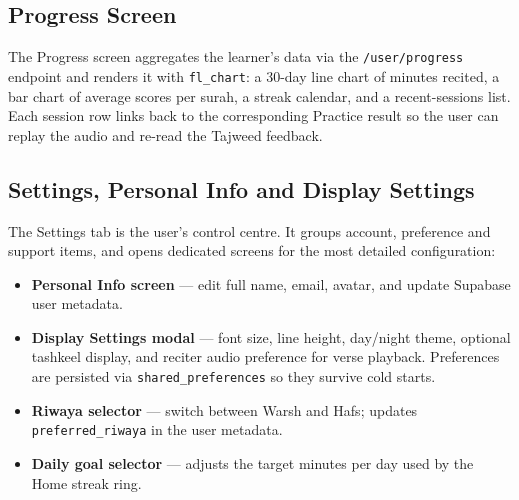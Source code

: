 


\subsection{Progress Screen}

The Progress screen aggregates the learner's data via the \texttt{/user/progress} endpoint and renders it with \texttt{fl\_chart}: a 30-day line chart of minutes recited, a bar chart of average scores per surah, a streak calendar, and a recent-sessions list. Each session row links back to the corresponding Practice result so the user can replay the audio and re-read the Tajweed feedback.


\subsection{Settings, Personal Info and Display Settings}

The Settings tab is the user's control centre. It groups account, preference and support items, and opens dedicated screens for the most detailed configuration:

\begin{itemize}[leftmargin=2em]
  \item \textbf{Personal Info screen} --- edit full name, email, avatar, and update Supabase user metadata.
  \item \textbf{Display Settings modal} --- font size, line height, day/night theme, optional tashkeel display, and reciter audio preference for verse playback. Preferences are persisted via \texttt{shared\_preferences} so they survive cold starts.
  \item \textbf{Riwaya selector} --- switch between Warsh and Hafs; updates \texttt{preferred\_riwaya} in the user metadata.
  \item \textbf{Daily goal selector} --- adjusts the target minutes per day used by the Home streak ring.
\end{itemize}


